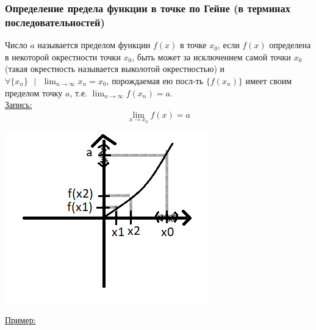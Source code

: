 \documentclass[12pt]{article}
\def\posl#1#2{\{#1_{#2}\}}
\begin{document}
    \subsubsection*{Определение предела функции в точке по Гейне (в терминах последовательностей)}
    Число $a$ называется пределом функции $f(x)$ в точке $x_0$, если $f(x)$ определена в некоторой окрестности точки $x_0$, быть может за исключением самой точки $x_0$ (такая окрестность называется выколотой окрестностью) и $\forall \posl{x}{n} \text{ } \big| \text{ } \lim_{n\to\infty}x_n = x_0$, порождаемая ею посл-ть $\{f(x_n)\}$ имеет своим пределом точку $a$, т.е. $\lim_{n\to\infty}f(x_n) = a$.\\
    \underline{Запись:}
    \[ \lim_{x \to x_0}f(x) = a \]
    \begin{center}
        \includegraphics{3.1.1}
    \end{center}
    \underline{Пример:}
\end{document}
